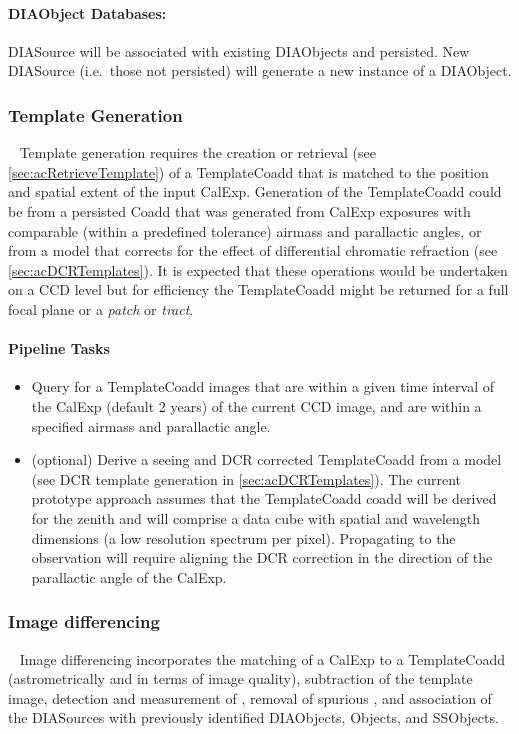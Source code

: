 \paragraph*{DIAObject Databases:} DIASource will be associated with existing DIAObjects and persisted. New DIASource (i.e.\ those not persisted) will generate a new instance of a DIAObject.


\subsubsection{Template Generation}~
\label{sec:apCRTemplates}
Template generation requires the creation or retrieval (see \ref{sec:acRetrieveTemplate}) of a TemplateCoadd that is matched to the position and spatial extent of the input CalExp. Generation of the TemplateCoadd could be from a persisted Coadd that was generated from CalExp exposures with comparable (within a predefined tolerance) airmass and parallactic angles, or from a model that corrects for the effect of  differential chromatic refraction (see \ref{sec:acDCRTemplates}). It is expected that these operations would be undertaken on a CCD level but for efficiency the TemplateCoadd might be returned for a full focal plane or a {\it patch}  or {\it tract}. 


\paragraph{Pipeline Tasks}

\begin{itemize}
\item Query for a TemplateCoadd images that are within a given time interval of the CalExp  (default 2 years) of the current CCD image, and are within a specified airmass and parallactic angle.
\item (optional) Derive a seeing and DCR corrected TemplateCoadd from a model (see DCR template generation in \ref{sec:acDCRTemplates}). The current prototype approach assumes that the TemplateCoadd coadd will be derived for the zenith and will comprise a data cube with spatial and wavelength dimensions (a low resolution spectrum per pixel). Propagating to the observation will require aligning the DCR correction in the direction of the parallactic angle of the CalExp.
\end{itemize}

\subsubsection{Image differencing}~
Image differencing incorporates the matching of a CalExp to a TemplateCoadd (astrometrically and in terms of image quality), subtraction of the template image, detection and measurement of \DIASources, removal of spurious \DIASources, and association of the DIASources with previously identified DIAObjects, Objects, and SSObjects. 

